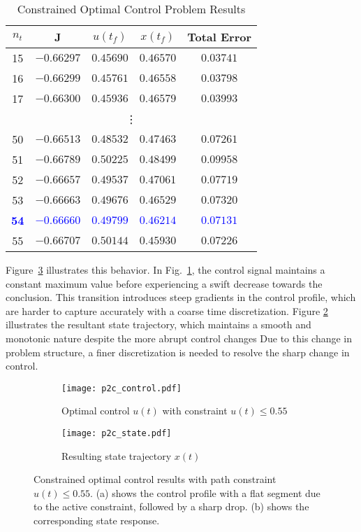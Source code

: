 \documentclass{article}
\begin{document}
\begin{table}[H]
\centering
\caption{Constrained Optimal Control Problem Results}
\label{tab:constrained_ocp}
\begin{tabular}{|c|c|c|c|c|}
\hline
\textbf{$n_t$} & \textbf{J} & \textbf{$u(t_f)$} & \textbf{$x(t_f)$} & \textbf{Total Error} \\
\hline
15 & $-0.66297$ & $0.45690$ & $0.46570$ & $0.03741$ \\
16 & $-0.66299$ & $0.45761$ & $0.46558$ & $0.03798$ \\
17 & $-0.66300$ & $0.45936$ & $0.46579$ & $0.03993$ \\
\hline
\multicolumn{5}{|c|}{\vdots} \\
\hline
50 & $-0.66513$ & $0.48532$ & $0.47463$ & $0.07261$ \\
51 & $-0.66789$ & $0.50225$ & $0.48499$ & $0.09958$ \\
52 & $-0.66657$ & $0.49537$ & $0.47061$ & $0.07719$ \\
53 & $-0.66663$ & $0.49676$ & $0.46529$ & $0.07320$ \\
\textbf{\textcolor{blue}{54}} &
\textbf{\textcolor{blue}{$-0.66660$}} &
\textbf{\textcolor{blue}{$0.49799$}} &
\textbf{\textcolor{blue}{$0.46214$}} &
\textbf{\textcolor{blue}{$0.07131$}} \\
55 & $-0.66707$ & $0.50144$ & $0.45930$ & $0.07226$ \\
\hline
\end{tabular}
\end{table}
Figure~\ref{fig:p2c_results} illustrates this behavior. In Fig.~\ref{fig:p2c_control}, the control signal maintains a constant maximum value before experiencing a swift decrease towards the conclusion. This transition introduces steep gradients in the control profile, which are harder to capture accurately with a coarse time discretization. Figure \ref{fig:p2c_state} illustrates the resultant state trajectory, which maintains a smooth and monotonic nature despite the more abrupt control changes Due to this change in problem structure, a finer discretization is needed to resolve the sharp change in control.

\begin{figure}[H]
    \centering
    \begin{subfigure}[t]{0.45\textwidth}
        \centering
        \texttt{[image: p2c\_control.pdf]}
        \caption{Optimal control $u(t)$ with constraint $u(t) \leq 0.55$}
        \label{fig:p2c_control}
    \end{subfigure}
    \hfill
    \begin{subfigure}[t]{0.45\textwidth}
        \centering
        \texttt{[image: p2c\_state.pdf]}
        \caption{Resulting state trajectory $x(t)$}
        \label{fig:p2c_state}
    \end{subfigure}
    \caption{Constrained optimal control results with path constraint $u(t) \leq 0.55$. 
    (a) shows the control profile with a flat segment due to the active constraint, 
    followed by a sharp drop. (b) shows the corresponding state response.}
    \label{fig:p2c_results}
\end{figure}
\end{document}
